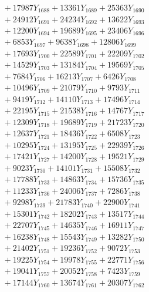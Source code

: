 \documentclass[a4paper,10pt]{article}
\begin{document}
{\begin{align}
&\;  + 17987 Y_{1688} + 13361 Y_{1689} + 25363 Y_{1690} \\[0.3ex]
&\;  + 24912 Y_{1691} + 24234 Y_{1692} + 13622 Y_{1693} \\[0.3ex]
&\;  + 12200 Y_{1694} + 19689 Y_{1695} + 23406 Y_{1696} \\[0.3ex]
&\;  + 6853 Y_{1697} + 9638 Y_{1698} + 12806 Y_{1699} \\[0.3ex]
&\;  + 17693 Y_{1700} + 22589 Y_{1701} + 22209 Y_{1702} \\[0.3ex]
&\;  + 14529 Y_{1703} + 13184 Y_{1704} + 19569 Y_{1705} \\[0.3ex]
&\;  + 7684 Y_{1706} + 16213 Y_{1707} + 6426 Y_{1708} \\[0.5ex]\allowbreak
&\;  + 10496 Y_{1709} + 21079 Y_{1710} + 9793 Y_{1711} \\[0.3ex]
&\;  + 9419 Y_{1712} + 14110 Y_{1713} + 17496 Y_{1714} \\[0.3ex]
&\;  + 22195 Y_{1715} + 21538 Y_{1716} + 14767 Y_{1717} \\[0.3ex]
&\;  + 12309 Y_{1718} + 19689 Y_{1719} + 21723 Y_{1720} \\[0.3ex]
&\;  + 12637 Y_{1721} + 18436 Y_{1722} + 6508 Y_{1723} \\[0.3ex]
&\;  + 10295 Y_{1724} + 13195 Y_{1725} + 22939 Y_{1726} \\[0.3ex]
&\;  + 17421 Y_{1727} + 14200 Y_{1728} + 19521 Y_{1729} \\[0.3ex]
&\;  + 9023 Y_{1730} + 14101 Y_{1731} + 15508 Y_{1732} \\[0.3ex]
&\;  + 17788 Y_{1733} + 14863 Y_{1734} + 15736 Y_{1735} \\[0.3ex]
&\;  + 11233 Y_{1736} + 24006 Y_{1737} + 7286 Y_{1738} \\[0.5ex]\allowbreak
&\;  + 9298 Y_{1739} + 21783 Y_{1740} + 22900 Y_{1741} \\[0.3ex]
&\;  + 15301 Y_{1742} + 18202 Y_{1743} + 13517 Y_{1744} \\[0.3ex]
&\;  + 22707 Y_{1745} + 14635 Y_{1746} + 16911 Y_{1747} \\[0.3ex]
&\;  + 16238 Y_{1748} + 15543 Y_{1749} + 13282 Y_{1750} \\[0.3ex]
&\;  + 21402 Y_{1751} + 19236 Y_{1752} + 9072 Y_{1753} \\[0.3ex]
&\;  + 19225 Y_{1754} + 19978 Y_{1755} + 22771 Y_{1756} \\[0.3ex]
&\;  + 19041 Y_{1757} + 20052 Y_{1758} + 7423 Y_{1759} \\[0.3ex]
&\;  + 17144 Y_{1760} + 13674 Y_{1761} + 20307 Y_{1762} \\[0.3ex]

\end{align}}
\end{document}
